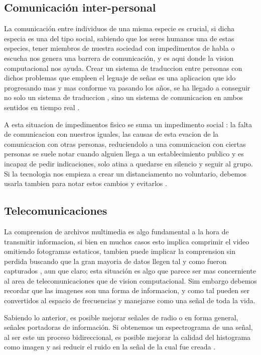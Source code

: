 \documentclass[a4paper]{IEEEtranUNT}
\begin{document}
\subsection{Comunicación inter-personal}

La comunicación entre individuos de una misma especie es crucial, si dicha especia es una del tipo social, sabiendo que los seres humanos una de estas especies, tener miembros de nuestra sociedad con impedimentos de habla o escucha nos genera una barrera de comunicación, y es aqui donde la vision computacional nos ayuda. Crear un sistema de traduccion entre personas con dichos problemas que empleen el leguaje de señas \citep{Bohra2019} es una aplicacion que ido progresando mas y mas conforme va pasando los años, se ha llegado a conseguir no solo un sistema de traduccion , sino un sistema de comunicacion en ambos sentidos en tiempo real \citep{Bohra2019}.

A esta situacion de impedimentos fisico se suma un impedimento social : la falta de comunicacion con nuestros iguales, las causas de esta evacion de la comunicacion con otras personas, reduciendolo a una comunicacion con ciertas personas se suele notar cuando alguien llega a un establecimiento publico y es incapaz de pedir indicaciones, solo atina a quedarse en silencio y seguir al grupo. Si la tecnologia nos empieza a crear un distanciamento no voluntario, debemos usarla tambien para notar estos cambios y evitarlos \citep{Bohra2019}.

\subsection{Telecomunicaciones}

La comprension de archivos multimedia es algo fundamental a la hora de transmitir informacion, si bien en muchos casos esto implica comprimir el video omitiendo fotogramas estaticos, tambien puede implicar la comprension sin perdida buscando que la gran mayoria de datos llegen tal y como fueron capturados \citep{Porat2010}, aun que claro; esta situación es algo que parece ser mas concerniente al area de telecomunicaciones que de vision computacional. Sim embargo debemos recordar que las imagenes son una forma de informacion, y como tal pueden ser convertidos al espacio de frecuencias \citep{Phonsri2015} y manejarse como una señal de toda la vida.

Sabiendo lo anterior, es posible mejorar señales de radio o en forma general, señales portadoras de información. Si obtenemos un espectrograma de una señal, al ser este un proceso bidireccional, es posible mejorar la calidad del histograma como imagen y asi reducir el ruido en la señal de la cual fue creada \citep{Phonsri2015}.
\end{document}
